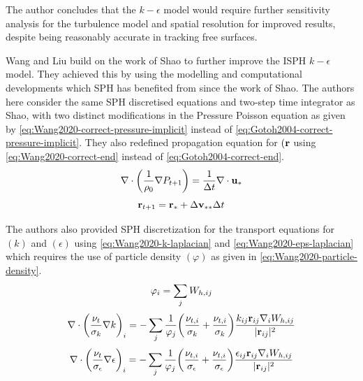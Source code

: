 The author concludes that the $k-\epsilon$ model would require further sensitivity analysis for the turbulence model and spatial resolution for improved results, despite being reasonably accurate in tracking free surfaces.

Wang and Liu \parencite{Wang2020} build on the work of Shao \parencite{Shao2006} to further improve the ISPH $k-\epsilon$ model. They achieved this by using the modelling and computational developments which SPH has benefited from since the work of Shao.
The authors here consider the same SPH discretised equations and two-step time integrator as Shao, with two distinct modifications in the Pressure Poisson equation as given by \ref{eq:Wang2020-correct-pressure-implicit} instead of \ref{eq:Gotoh2004-correct-pressure-implicit}. They also redefined propagation equation for $(\mathbf{r}$ using \ref{eq:Wang2020-correct-end} instead of \ref{eq:Gotoh2004-correct-end}.
\begin{equation}
	\nabla \cdot \bigg( \frac{1}{\rho_0} \nabla P_{t+1} \bigg) = \frac{1}{\Delta t} \nabla \cdot \mathbf{u_*}
	\label{eq:Wang2020-correct-pressure-implicit}
\end{equation}
\begin{equation}
	\mathbf{r}_{t+1} = \mathbf{r}_* + \Delta \mathbf{v}_{**} \Delta t
	\label{eq:Wang2020-correct-end}
\end{equation}

The authors also provided SPH discretization for the transport equations for $(k)$ and $(\epsilon)$ using \ref{eq:Wang2020-k-laplacian} and \ref{eq:Wang2020-eps-laplacian} which requires the use of particle density $(\varphi)$ as given in \ref{eq:Wang2020-particle-density}.
\begin{equation}
	\varphi_i = \sum_j W_{h, ij}
	\label{eq:Wang2020-particle-density}
\end{equation}
\begin{equation}
	\nabla \cdot \bigg( \frac{\nu_t}{\sigma_k} \nabla k \bigg)_i = - \sum_j \frac{1}{\varphi_j} \bigg( \frac{\nu_{t,i}}{\sigma_k} + \frac{\nu_{t,i}}{\sigma_k}  \bigg) \frac{k_{ij} \mathbf{r}_{ij} \nabla_{i} W_{h, ij}}{|\mathbf{r}_{ij}|^{2}}
	\label{eq:Wang2020-k-laplacian}
\end{equation}
\begin{equation}
	\nabla \cdot \bigg( \frac{\nu_t}{\sigma_{\epsilon}} \nabla \epsilon \bigg)_i = - \sum_j \frac{1}{\varphi_j} \bigg( \frac{\nu_{t,i}}{\sigma_{\epsilon}} + \frac{\nu_{t,i}}{\sigma_{\epsilon}}  \bigg) \frac{\epsilon_{ij} \mathbf{r}_{ij} \nabla_{i} W_{h, ij}}{|\mathbf{r}_{ij}|^{2}}
	\label{eq:Wang2020-eps-laplacian}
\end{equation}

